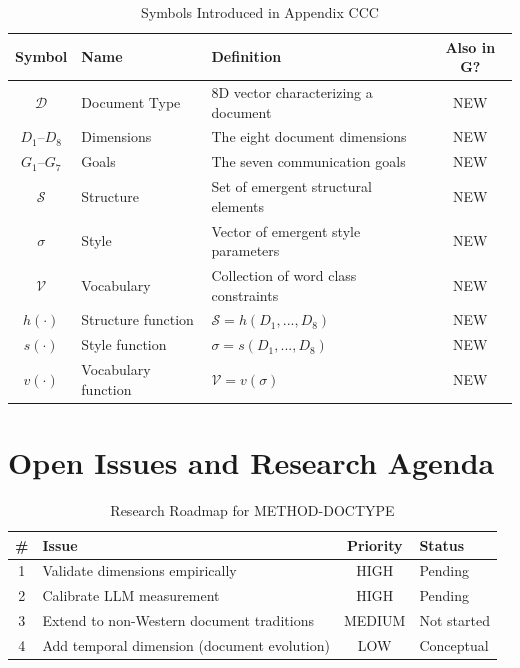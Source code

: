 \vspace{0.5em}

\begin{table}[htbp]
\centering
\caption{Symbols Introduced in Appendix CCC}
\label{tab:doctype-symbols}
\renewcommand{\arraystretch}{1.3}
\begin{tabular}{@{}clp{6cm}c@{}}
\toprule
\textbf{Symbol} & \textbf{Name} & \textbf{Definition} & \textbf{Also in G?} \\
\midrule
$\mathcal{D}$ & Document Type & 8D vector characterizing a document & NEW \\
$D_1$--$D_8$ & Dimensions & The eight document dimensions & NEW \\
$G_1$--$G_7$ & Goals & The seven communication goals & NEW \\
$\mathcal{S}$ & Structure & Set of emergent structural elements & NEW \\
$\sigma$ & Style & Vector of emergent style parameters & NEW \\
$\mathcal{V}$ & Vocabulary & Collection of word class constraints & NEW \\
$h(\cdot)$ & Structure function & $\mathcal{S} = h(D_1,...,D_8)$ & NEW \\
$s(\cdot)$ & Style function & $\sigma = s(D_1,...,D_8)$ & NEW \\
$v(\cdot)$ & Vocabulary function & $\mathcal{V} = v(\sigma)$ & NEW \\
\bottomrule
\end{tabular}
\end{table}


\section{Open Issues and Research Agenda}
\label{sec:doctype-open}

\begin{table}[htbp]
\centering
\caption{Research Roadmap for METHOD-DOCTYPE}
\label{tab:doctype-roadmap}
\renewcommand{\arraystretch}{1.3}
\begin{tabular}{@{}clcl@{}}
\toprule
\textbf{\#} & \textbf{Issue} & \textbf{Priority} & \textbf{Status} \\
\midrule
1 & Validate dimensions empirically & HIGH & Pending \\
2 & Calibrate LLM measurement & HIGH & Pending \\
3 & Extend to non-Western document traditions & MEDIUM & Not started \\
4 & Add temporal dimension (document evolution) & LOW & Conceptual \\
\bottomrule
\end{tabular}
\end{table}


